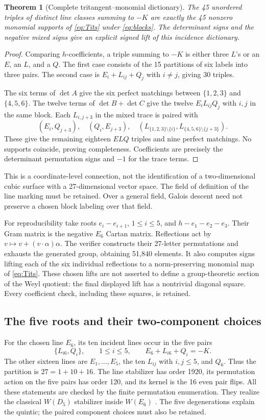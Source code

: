\documentclass[11pt]{article}
\newtheorem{theorem}{Theorem}[section]
\theoremstyle{remark}\newtheorem{remark}[theorem]{Remark}
\begin{document}
\begin{theorem}[Complete tritangent--monomial dictionary]\label{thm:dictionary}
The 45 unordered triples of distinct line classes summing to $-K$ are exactly the 45 nonzero monomial supports of \eqref{eq:Tits} under \eqref{eq:blocks}. The determinant signs and the negative mixed signs give an explicit signed lift of this incidence dictionary.
\end{theorem}
\begin{proof}
Comparing $h$-coefficients, a triple summing to $-K$ is either three $L$'s or an $E$, an $L$, and a $Q$. The first case consists of the 15 partitions of six labels into three pairs. The second case is $E_i+L_{ij}+Q_j$ with $i\ne j$, giving 30 triples.

The six terms of $\det A$ give the six perfect matchings between $\{1,2,3\}$ and $\{4,5,6\}$. The twelve terms of $\det B+\det C$ give the twelve $E_iL_{ij}Q_j$ with $i,j$ in the same block. Each $L_{i,j+3}$ in the mixed trace is paired with
\[
 (E_i,Q_{j+3}),\quad(Q_i,E_{j+3}),\quad
 (L_{\{1,2,3\}\setminus\{i\}},L_{\{4,5,6\}\setminus\{j+3\}}).
\]
These give the remaining eighteen $ELQ$ triples and nine perfect matchings. No supports coincide, proving completeness. Coefficients are precisely the determinant permutation signs and $-1$ for the trace terms.
\end{proof}
This is a coordinate-level connection, not the identification of a two-dimensional cubic surface with a 27-dimensional vector space. The field of definition of the line marking must be retained. Over a general field, Galois descent need not preserve a chosen block labeling over that field.

For reproducibility take roots $e_i-e_{i+1}$, $1\le i\le5$, and $h-e_1-e_2-e_3$. Their Gram matrix is the negative $E_6$ Cartan matrix. Reflections act by $v\mapsto v+(v\cdot\alpha)\alpha$. The verifier constructs their 27-letter permutations and exhausts the generated group, obtaining 51,840 elements. It also computes signs lifting each of the six individual reflections to a norm-preserving monomial map of \eqref{eq:Tits}. These chosen lifts are not asserted to define a group-theoretic section of the Weyl quotient: the final displayed lift has a nontrivial diagonal square. Every coefficient check, including these squares, is retained.

\subsection{The five roots and their two-component choices}
For the chosen line $E_6$, its ten incident lines occur in the five pairs
\[
 \{L_{i6},Q_i\},\qquad 1\le i\le5,
\qquad E_6+L_{i6}+Q_i=-K.
\]
The other sixteen lines are $E_1,\ldots,E_5$, the ten $L_{ij}$ with $i,j\le5$, and $Q_6$. Thus the partition is $27=1+10+16$. The line stabilizer has order 1920, its permutation action on the five pairs has order 120, and its kernel is the 16 even pair flips. All these statements are checked by the finite permutation enumeration. They realize the classical $W(D_5)$ stabilizer inside $W(E_6)$ \citep[\S1]{bayerserre}. The five degenerations explain the quintic; the paired component choices must also be retained.
\end{document}
